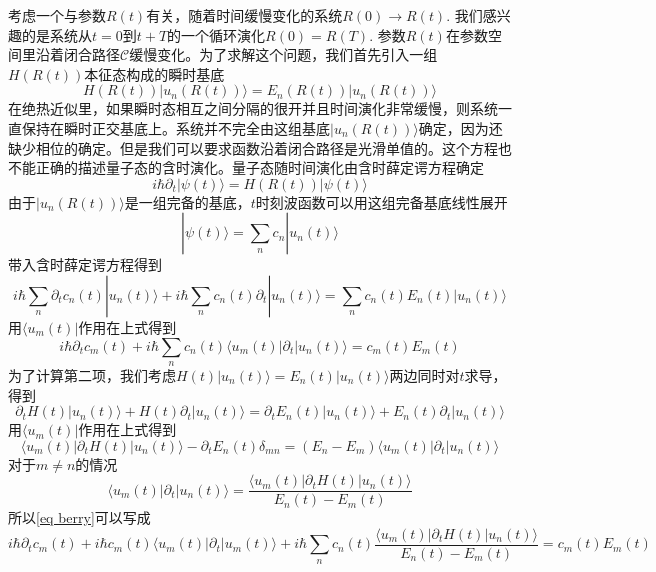 \documentclass{article}
\numberwithin{equation}{subsection}
\begin{document}
考虑一个与参数$R(t)$有关，随着时间缓慢变化的系统$R(0)\rightarrow R(t)$. 我们感兴趣的是系统从$t=0$到$t+T$的一个循环演化$R(0)=R(T)$. 参数$R(t)$在参数空间里沿着闭合路径$\mathcal{C}$缓慢变化。为了求解这个问题，我们首先引入一组$H(R(t))$本征态构成的瞬时基底
\begin{equation}
    H(R(t))|u_n(R(t))\rangle=E_n(R(t))|u_n(R(t))\rangle
\end{equation}
在绝热近似里，如果瞬时态相互之间分隔的很开并且时间演化非常缓慢，则系统一直保持在瞬时正交基底上。系统并不完全由这组基底$|u_n(R(t))\rangle$确定，因为还缺少相位的确定。但是我们可以要求函数沿着闭合路径是光滑单值的。这个方程也不能正确的描述量子态的含时演化。量子态随时间演化由含时薛定谔方程确定
\begin{equation}
    i\hbar\partial_t|\psi(t)\rangle=H(R(t))|\psi(t)\rangle
\end{equation}
由于$|u_n(R(t))\rangle$是一组完备的基底，$t$时刻波函数可以用这组完备基底线性展开
\begin{equation}
    |\psi(t)\rangle=\sum_{n}c_n|u_n(t)\rangle
\end{equation}
带入含时薛定谔方程得到
\begin{equation}
    i\hbar\sum_{n}\partial_tc_n(t)|u_n(t)\rangle+i\hbar\sum_{n}c_n(t)\partial_t|u_n(t)\rangle=\sum_{n}c_n(t)E_n(t)|u_n(t)\rangle
\end{equation}
用$\langle u_m(t)|$作用在上式得到
\begin{equation}\label{eq berry}
    i\hbar\partial_tc_m(t)+i\hbar\sum_{n}c_n(t)\langle u_m(t)|\partial_t|u_n(t)\rangle=c_m(t)E_m(t)
\end{equation}
为了计算第二项，我们考虑$H(t)|u_n(t)\rangle=E_n(t)|u_n(t)\rangle$两边同时对$t$求导，得到
\begin{equation}
    \partial_tH(t)|u_n(t)\rangle+H(t)\partial_t|u_n(t)\rangle=\partial_tE_n(t)|u_n(t)\rangle+E_n(t)\partial_t|u_n(t)\rangle
\end{equation}
用$\langle u_m(t)|$作用在上式得到
\begin{equation}
    \langle u_m(t)|\partial_tH(t)|u_n(t)\rangle-\partial_tE_n(t)\delta_{mn}=(E_n-E_m)\langle u_m(t)|\partial_t|u_n(t)\rangle
\end{equation}
对于$m\neq n$的情况
\begin{equation}
    \langle u_m(t)|\partial_t|u_n(t)\rangle=\frac{\langle u_m(t)|\partial_tH(t)|u_n(t)\rangle}{E_n(t)-E_m(t)}
\end{equation}
所以\eqref{eq berry}可以写成
\begin{equation}
    i\hbar\partial_tc_m(t)+i\hbar c_m(t)\langle u_m(t)|\partial_t|u_m(t)\rangle+i\hbar\sum_{n}c_n(t)\frac{\langle u_m(t)|\partial_tH(t)|u_n(t)\rangle}{E_n(t)-E_m(t)}=c_m(t)E_m(t)
\end{equation}
\end{document}
